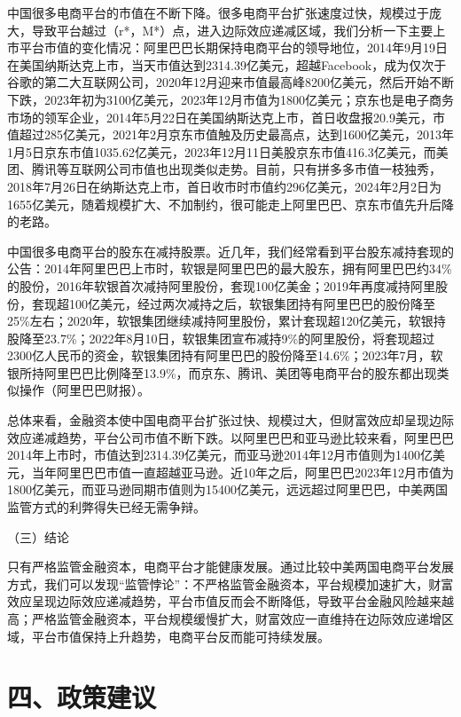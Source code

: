 \documentclass[12pt,twoside,utf8]{ctexart}
\begin{document}
中国很多电商平台的市值在不断下降。很多电商平台扩张速度过快，规模过于庞大，导致平台越过（r*，M*）点，进入边际效应递减区域，我们分析一下主要上市平台市值的变化情况：阿里巴巴长期保持电商平台的领导地位，2014年9月19日在美国纳斯达克上市，当天市值达到2314.39亿美元，超越Facebook，成为仅次于谷歌的第二大互联网公司，2020年12月迎来市值最高峰8200亿美元，然后开始不断下跌，2023年初为3100亿美元，2023年12月市值为1800亿美元；京东也是电子商务市场的领军企业，2014年5月22日在美国纳斯达克上市，首日收盘报20.9美元，市值超过285亿美元，2021年2月京东市值触及历史最高点，达到1600亿美元，2013年1月5日京东市值1035.62亿美元，2023年12月11日美股京东市值416.3亿美元，而美团、腾讯等互联网公司市值也出现类似走势。目前，只有拼多多市值一枝独秀，2018年7月26日在纳斯达克上市，首日收市时市值约296亿美元，2024年2月2日为1655亿美元，随着规模扩大、不加制约，很可能走上阿里巴巴、京东市值先升后降的老路。

中国很多电商平台的股东在减持股票。近几年，我们经常看到平台股东减持套现的公告：2014年阿里巴巴上市时，软银是阿里巴巴的最大股东，拥有阿里巴巴约34\%的股份，2016年软银首次减持阿里股份，套现100亿美金；2019年再度减持阿里股份，套现超100亿美元，经过两次减持之后，软银集团持有阿里巴巴的股份降至25\%左右；2020年，软银集团继续减持阿里股份，累计套现超120亿美元，软银持股降至23.7\%；2022年8月10日，软银集团宣布减持9\%的阿里股份，将套现超过2300亿人民币的资金，软银集团持有阿里巴巴的股份降至14.6\%；2023年7月，软银所持阿里巴巴比例降至13.9\%，而京东、腾讯、美团等电商平台的股东都出现类似操作（阿里巴巴财报）。

总体来看，金融资本使中国电商平台扩张过快、规模过大，但财富效应却呈现边际效应递减趋势，平台公司市值不断下跌。以阿里巴巴和亚马逊比较来看，阿里巴巴2014年上市时，市值达到2314.39亿美元，而亚马逊2014年12月市值则为1400亿美元，当年阿里巴巴市值一直超越亚马逊。近10年之后，阿里巴巴2023年12月市值为1800亿美元，而亚马逊同期市值则为15400亿美元，远远超过阿里巴巴，中美两国监管方式的利弊得失已经无需争辩。

（三）结论

只有严格监管金融资本，电商平台才能健康发展。通过比较中美两国电商平台发展方式，我们可以发现“监管悖论”：不严格监管金融资本，平台规模加速扩大，财富效应呈现边际效应递减趋势，平台市值反而会不断降低，导致平台金融风险越来越高；严格监管金融资本，平台规模缓慢扩大，财富效应一直维持在边际效应递增区域，平台市值保持上升趋势，电商平台反而能可持续发展。

{\centering\section *{四、政策建议}}
\end{document}
